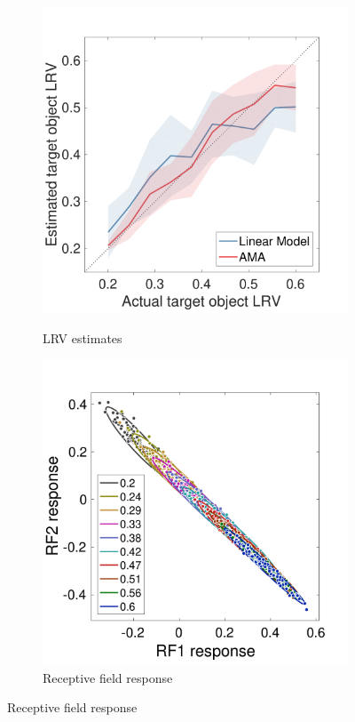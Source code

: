\documentclass{jov}
\begin{document}
\begin{figure}
\centering
            \begin{subfigure}[b]{0.25 \textwidth}
        \caption{LRV estimates}
        \includegraphics[width=\textwidth, trim={0 0 0 1.3cm},clip]{../FiguresDraft5/Figure12/Figure12_a.pdf}
        \label{fig:case3Estimates}
    \end{subfigure} 
        \begin{subfigure}[b]{0.26\textwidth}
        \caption{Receptive field response}
        \includegraphics[width=\textwidth, trim={0 3mm 0 15mm},clip]{../FiguresDraft5/Figure12/Figure12_b.pdf}

\end{subfigure}
\end{figure}
\end{document}
